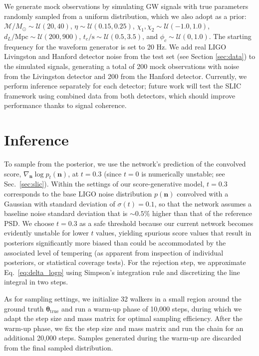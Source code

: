 \documentclass[twocolumn]{aastex631}
\begin{document}
We generate mock observations by simulating GW signals with true parameters randomly sampled from a uniform distribution, which we also adopt as a prior: \(\mathcal{M}/M_\odot \sim \mathcal{U}(20, 40)\), \(\eta \sim \mathcal{U}(0.15, 0.25)\), \(\chi_1, \chi_2 \sim \mathcal{U}(-1.0, 1.0)\), \(d_{L}/\mathrm{Mpc} \sim \mathcal{U}(200, 900)\), \(t_c / \mathrm{s} \sim \mathcal{U}(0.5, 3.5)\), and \(\phi_c \sim \mathcal{U}(0, 1.0)\). The starting frequency for the waveform generator is set to 20 Hz. We add real LIGO Livingston and Hanford detector noise from the test set (see Section \ref{sec:data}) to the simulated signals, generating a total of 200 mock observations with noise from the Livingston detector and 200 from the Hanford detector. Currently, we perform inference separately for each detector; future work will test the SLIC framework using combined data from both detectors, which should improve performance thanks to signal coherence.

\section{Inference}
\label{sec:inference}

To sample from the posterior, we use the network's prediction of the convolved score, $\nabla_{\boldsymbol{n}} \log p_{t}(\boldsymbol{n})$, at $t = 0.3$ (since $t =0$ is numerically unstable; see Sec.~\ref{sec:slic}). Within the settings of our score-generative model, $t = 0.3$ corresponds to the base LIGO noise distribution $p(\boldsymbol{n})$ convolved with a Gaussian with standard deviation of $\sigma(t) = 0.1$, so that the network assumes a baseline noise standard deviation that is ${\sim}0.5\%$ higher than that of the reference PSD. We choose $t = 0.3$ as a safe threshold because our current network becomes evidently unstable for lower $t$ values, yielding spurious score values that result in posteriors significantly more biased than could be accommodated by the associated level of tempering (as apparent from inspection of individual posteriors, or statistical coverage tests). For the rejection step, we approximate Eq.~\eqref{eq:delta_logp} using Simpson's integration rule and discretizing the line integral in two steps. 

As for sampling settings, we initialize 32 walkers in a small region around the ground truth $\boldsymbol{\theta}_{\text{true}}$ and run a warm-up phase of 10,000 steps, during which we adapt the step size and mass matrix for optimal sampling efficiency. After the warm-up phase, we fix the step size and mass matrix and run the chain for an additional 20,000 steps. Samples generated during the warm-up are discarded from the final sampled distribution. 
\end{document}
